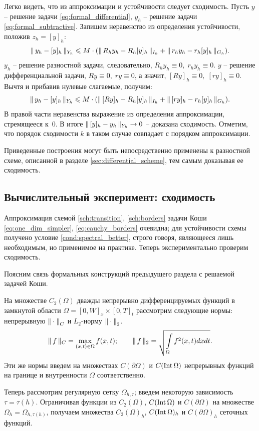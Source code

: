 Легко видеть, что из аппроксимации и устойчивости следует сходимость. Пусть $y$ -- решение задачи \eqref{eq:formal_differential}, $y_h$ -- решение задачи \eqref{eq:formal_subtractive}. Запишем неравенство из определения устойчивости, положив $z_h = [y]_h$:
$$\| \, y_h - [y]_h \, \|_{Y_h} \leqslant M \cdot (\| \, R_h y_h - R_h [y]_h \, \|_{I_h} + \| \, r_h y_h - r_h [y]_h \, \|_{G_h}) {\text{.}}$$
$y_h$ -- решение разностной задачи, следовательно, $R_h y_h \equiv 0, \; r_h y_h \equiv 0$. $y$ -- решение дифференциальной задачи, $Ry \equiv 0, \; ry \equiv 0$, а значит, $[Ry]_h \equiv 0, \; [ry]_h \equiv 0$. Вычтя и прибавив нулевые слагаемые, получим:
$$\| \, y_h - [y]_h \, \|_{Y_h} \leqslant M \cdot (\| \, [Ry]_h - R_h [y]_h \, \|_{I_h} + \| \, [ry]_h - r_h [y]_h \, \|_{G_h}) {\text{.}}$$
В правой части неравенства выражение из определения аппроксимации, стремящееся к~$0$. В итоге $\| \, [y]_h - y_h \, \|_{Y_h} \to 0$ -- доказана сходимость. Отметим, что порядок сходимости $k$ в таком случае совпадает с порядком аппроксимации.

Приведенные построения могут быть непосредственно применены к разностной схеме, описанной в разделе \ref{sec:differential_scheme}, тем самым доказывая ее сходимость.


\subsection{Вычислительный эксперимент: сходимость}

Аппроксимация схемой \eqref{sch:transition}, \eqref{sch:borders} задачи Коши \eqref{eq:one_dim_simpler}, \eqref{eq:cauchy_borders} очевидна; для устойчивости схемы получено условие \eqref{cond:spectral_better}, строго говоря, являющееся лишь необходимым, но применимое на практике. Теперь экспериментально проверим сходимость.

Поясним связь формальных конструкций предыдущего раздела с решаемой задачей Коши.

На множестве $C_2(\Omega)$ дважды непрерывно дифференцируемых функций в замкнутой области $\Omega = [0, W]_x \times [0, T]_t$ рассмотрим следующие нормы: непрерывную ${\| \cdot \|}_C$ и $L_2$-норму ${\| \cdot \|}_2$.
$$\| \, f \, \|_C = \max \limits_{(x, t) \in \Omega} f(x, t); \qquad \| \, f \, \|_2 = \sqrt{\int \limits_{\Omega} f^2(x, t) dx dt} {\text{.}}$$
Эти же нормы введем на множествах $C(\partial \Omega)$ и $C(\operatorname{{Int}} \Omega)$ непрерывных функций на границе и внутренности $\Omega$ соответственно.

Теперь рассмотрим регулярную сетку $\Omega_{h, \tau}$; введем некоторую зависимость $\tau = \tau(h)$. Ограничивая функции из $C_2(\Omega)$, $C(\operatorname{{Int}} \Omega)$ и $C(\partial \Omega)$ на множестве $\Omega_h = \Omega_{h, \tau(h)}$, получаем множества $C_2(\Omega)_h$, $C(\operatorname{{Int}} \Omega)_h$ и $C(\partial \Omega)_h$ сеточных функций.

